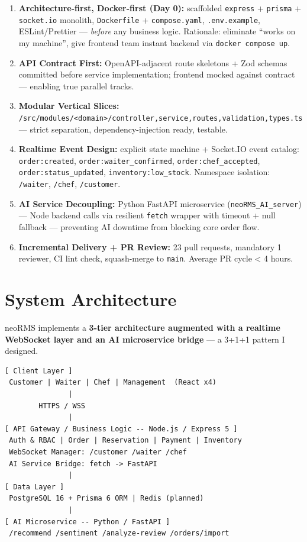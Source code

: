 \begin{enumerate}
\item \textbf{Architecture-first, Docker-first (Day 0):} scaffolded \texttt{express} + \texttt{prisma} + \texttt{socket.io} monolith, \texttt{Dockerfile} + \texttt{compose.yaml}, \texttt{.env.example}, ESLint/Prettier --- \textit{before} any business logic. Rationale: eliminate ``works on my machine'', give frontend team instant backend via \texttt{docker compose up}.
\item \textbf{API Contract First:} OpenAPI-adjacent route skeletons + Zod schemas committed before service implementation; frontend mocked against contract --- enabling true parallel tracks.
\item \textbf{Modular Vertical Slices:} \texttt{/src/modules/<domain>/{controller,service,routes,validation,types}.ts} --- strict separation, dependency-injection ready, testable.
\item \textbf{Realtime Event Design:} explicit state machine + Socket.IO event catalog: \texttt{order:created}, \texttt{order:waiter\_confirmed}, \texttt{order:chef\_accepted}, \texttt{order:status\_updated}, \texttt{inventory:low\_stock}. Namespace isolation: \texttt{/waiter}, \texttt{/chef}, \texttt{/customer}.
\item \textbf{AI Service Decoupling:} Python FastAPI microservice (\texttt{neoRMS\_AI\_server}) --- Node backend calls via resilient \texttt{fetch} wrapper with timeout + null fallback --- preventing AI downtime from blocking core order flow.
\item \textbf{Incremental Delivery + PR Review:} 23 pull requests, mandatory 1 reviewer, CI lint check, squash-merge to \texttt{main}. Average PR cycle < 4 hours.
\end{enumerate}

\section{System Architecture}
\label{sec:architecture}

neoRMS implements a \textbf{3-tier architecture augmented with a realtime WebSocket layer and an AI microservice bridge} --- a 3+1+1 pattern I designed.

{\footnotesize
\begin{verbatim}
[ Client Layer ]
 Customer | Waiter | Chef | Management  (React x4)
               |
        HTTPS / WSS
               |
[ API Gateway / Business Logic -- Node.js / Express 5 ]
 Auth & RBAC | Order | Reservation | Payment | Inventory
 WebSocket Manager: /customer /waiter /chef
 AI Service Bridge: fetch -> FastAPI
               |
[ Data Layer ]
 PostgreSQL 16 + Prisma 6 ORM | Redis (planned)
               |
[ AI Microservice -- Python / FastAPI ]
 /recommend /sentiment /analyze-review /orders/import
\end{verbatim}
}

